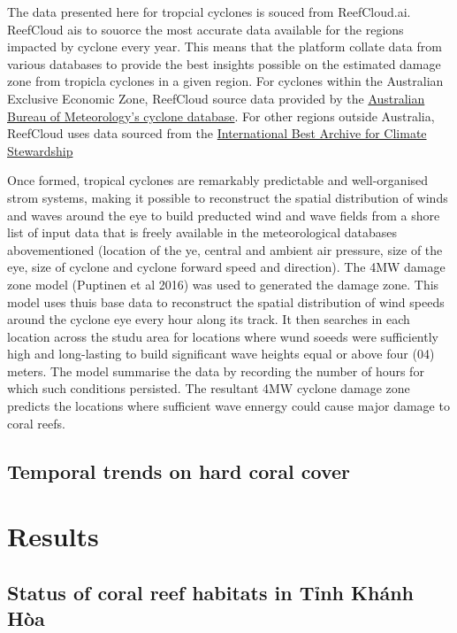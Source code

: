 \documentclass[
  letterpaper,
  DIV=11,
  numbers=noendperiod]{scrartcl}
\begin{document}
The data presented here for tropcial cyclones is souced from
ReefCloud.ai. ReefCloud ais to souorce the most accurate data available
for the regions impacted by cyclone every year. This means that the
platform collate data from various databases to provide the best
insights possible on the estimated damage zone from tropicla cyclones in
a given region. For cyclones within the Australian Exclusive Economic
Zone, ReefCloud source data provided by the
\href{http://www.bom.gov.au/cyclone/tropical-cyclone-knowledge-centre/databases/}{Australian
Bureau of Meteorology's cyclone database}. For other regions outside
Australia, ReefCloud uses data sourced from the
\href{https://www.ncdc.noaa.gov/ibtracs/}{International Best Archive for
Climate Stewardship}

Once formed, tropical cyclones are remarkably predictable and
well-organised strom systems, making it possible to reconstruct the
spatial distribution of winds and waves around the eye to build
preducted wind and wave fields from a shore list of input data that is
freely available in the meteorological databases abovementioned
(location of the ye, central and ambient air pressure, size of the eye,
size of cyclone and cyclone forward speed and direction). The 4MW damage
zone model (Puptinen et al 2016) was used to generated the damage zone.
This model uses thuis base data to reconstruct the spatial distribution
of wind speeds around the cyclone eye every hour along its track. It
then searches in each location across the studu area for locations where
wund soeeds were sufficiently high and long-lasting to build significant
wave heights equal or above four (04) meters. The model summarise the
data by recording the number of hours for which such conditions
persisted. The resultant 4MW cyclone damage zone predicts the locations
where sufficient wave ennergy could cause major damage to coral reefs.

\subsection{Temporal trends on hard coral
cover}\label{temporal-trends-on-hard-coral-cover}

\section{Results}\label{results}

\subsection{Status of coral reef habitats in Tỉnh Khánh
Hòa}\label{status-of-coral-reef-habitats-in-tux1ec9nh-khuxe1nh-huxf2a}
\end{document}
